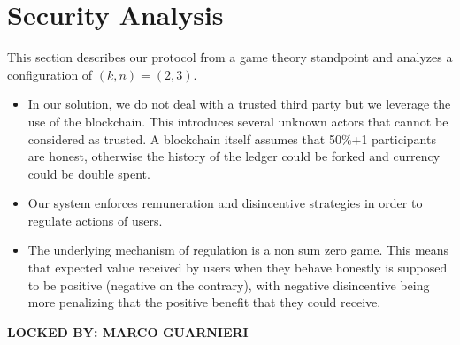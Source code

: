 \section{Security Analysis}\label{sect:analysis}

This section describes our protocol from a game theory standpoint and analyzes a configuration of $(k,n) = (2,3)$. 

\begin{itemize}

	\item In our solution, we do not deal with a trusted third party but we leverage the use of the blockchain. This introduces several unknown actors that cannot be considered as trusted. A blockchain itself assumes that 50\%+1 participants are honest, otherwise the history of the ledger could be forked and currency could be double spent.

	\item Our system enforces remuneration and disincentive strategies in order to regulate actions of users.

	\item The underlying mechanism of regulation is a non sum zero game. This means that expected value received by users when they behave honestly is supposed to be positive (negative on the contrary), with negative disincentive being more penalizing that the positive benefit that they could receive.

\end{itemize}

{\bf LOCKED BY: MARCO GUARNIERI}
